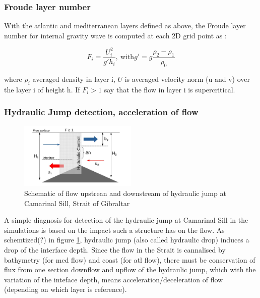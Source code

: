 
\subsubsection{Froude layer number}

With the atlantic and mediterranean layers defined as above, the Froude layer number for internal gravity wave is computed at each 2D grid point as : 

\begin{equation}
F_i=\frac{U_i^2}{g'h_i} , \ \text{with} g'=g \frac{\rho_2-\rho_1}{\rho_0}
\end{equation}

where $\rho_i$ averaged density in layer i,  $U$ is averaged velocity norm (u and v) over the layer i of height h. If $F_i>1$ say that the flow in layer i is supercritical.


\subsubsection{Hydraulic Jump detection, acceleration of flow}

\begin{figure}[!h]
 \centering
 \includegraphics[width=0.5\textwidth]{./GBR3D/schema_diagressaut.jpg}
 \caption {Schematic of flow upstrean and downstream of hydraulic jump at Camarinal Sill, Strait of Gibraltar}
  \label{schemaRH}
\end{figure}


A simple diagnosis for detection of the hydraulic jump at Camarinal Sill in the simulations is based on the impact such a structure has on the flow. As schemtized(?) in figure \ref{schemaRH}, hydraulic jump (also called hydraulic drop) induces a drop of the interface depth. Since the flow in the Strait is cannalised by bathymetry (for med flow) and coast (for atl flow), there must be conservation of flux from one section downflow and upflow of the hydraulic jump, which with the variation of the inteface depth, means acceleration/deceleration of flow (depending on which layer is reference).

